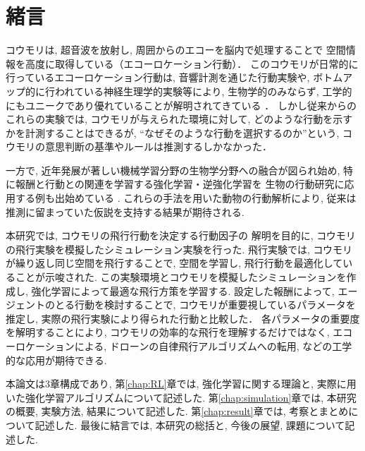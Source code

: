 \documentclass[../main]{subfiles}
\begin{document}
\newpage
\chapter*{緒言}

コウモリは, 超音波を放射し, 周囲からのエコーを脳内で処理することで
空間情報を高度に取得している（エコーロケーション行動）．
このコウモリが日常的に行っているエコーロケーション行動は, 
音響計測を通じた行動実験や, 
ボトムアップ的に行われている神経生理学的実験等により, 
生物学的のみならず, 
工学的にもユニークであり優れていることが解明されてきている
\cite{ref:bat_enhance}\cite{ref:echolocating_bats}．
しかし従来からのこれらの実験では, 
コウモリが与えられた環境に対して, 
どのような行動を示すかを計測することはできるが, 
“なぜそのような行動を選択するのか”という, 
コウモリの意思判断の基準やルールは推測するしかなかった．

一方で, 近年発展が著しい機械学習分野の生物学分野への融合が図られ始め, 
特に報酬と行動との関連を学習する強化学習・逆強化学習を
生物の行動研究に応用する例も出始めている
\cite{ref:simulating_bout}\cite{ref:can_ai}.
これらの手法を用いた動物の行動解析により, 
従来は推測に留まっていた仮説を支持する結果が期待される.

本研究では, コウモリの飛行行動を決定する行動因子の
解明を目的に, コウモリの飛行実験を模擬したシミュレーション実験を行った.
飛行実験では, コウモリが繰り返し同じ空間を飛行することで, 
空間を学習し, 飛行行動を最適化していることが示唆された.
この実験環境とコウモリを模擬したシミュレーションを作成し, 
強化学習によって最適な飛行方策を学習する.
設定した報酬によって, エージェントのとる行動を検討することで, 
コウモリが重要視しているパラメータを推定し, 
実際の飛行実験により得られた行動と比較した．
各パラメータの重要度を解明することにより, 
コウモリの効率的な飛行を理解するだけではなく, 
エコーロケーションによる, 
ドローンの自律飛行アルゴリズムへの転用, 
などの工学的な応用が期待できる.

本論文は3章構成であり, 
第\ref{chap:RL}章では, 
強化学習に関する理論と, 
実際に用いた強化学習アルゴリズムについて記述した.
第\ref{chap:simulation}章では, 
本研究の概要, 実験方法, 結果について記述した.
第\ref{chap:result}章では, 
考察とまとめについて記述した.
最後に結言では, 本研究の総括と, 
今後の展望, 課題について記述した.
\end{document}
